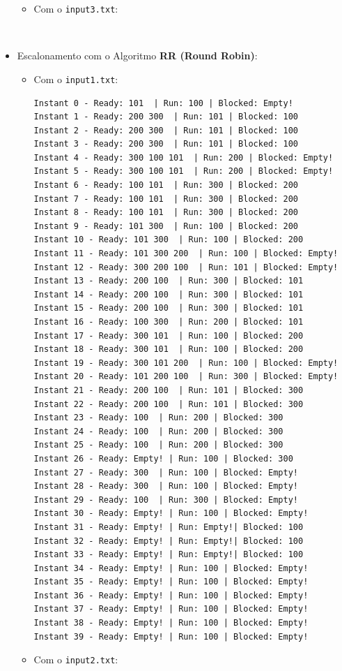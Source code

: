 \documentclass[11pt]{article}   %
\begin{document}
\begin{itemize}
\begin{itemize}
\begin{verbatim}
        \end{verbatim}
        \item Com o \verb|input3.txt|:
        \begin{verbatim}
            
        \end{verbatim}
    \end{itemize}
    \item Escalonamento com o Algoritmo \textbf{RR (Round Robin)}:
    \begin{itemize}
        \item Com o \verb|input1.txt|:
        \begin{verbatim}
Instant 0 - Ready: 101  | Run: 100 | Blocked: Empty!
Instant 1 - Ready: 200 300  | Run: 101 | Blocked: 100 
Instant 2 - Ready: 200 300  | Run: 101 | Blocked: 100 
Instant 3 - Ready: 200 300  | Run: 101 | Blocked: 100 
Instant 4 - Ready: 300 100 101  | Run: 200 | Blocked: Empty!
Instant 5 - Ready: 300 100 101  | Run: 200 | Blocked: Empty!
Instant 6 - Ready: 100 101  | Run: 300 | Blocked: 200 
Instant 7 - Ready: 100 101  | Run: 300 | Blocked: 200 
Instant 8 - Ready: 100 101  | Run: 300 | Blocked: 200 
Instant 9 - Ready: 101 300  | Run: 100 | Blocked: 200 
Instant 10 - Ready: 101 300  | Run: 100 | Blocked: 200 
Instant 11 - Ready: 101 300 200  | Run: 100 | Blocked: Empty!
Instant 12 - Ready: 300 200 100  | Run: 101 | Blocked: Empty!
Instant 13 - Ready: 200 100  | Run: 300 | Blocked: 101 
Instant 14 - Ready: 200 100  | Run: 300 | Blocked: 101 
Instant 15 - Ready: 200 100  | Run: 300 | Blocked: 101 
Instant 16 - Ready: 100 300  | Run: 200 | Blocked: 101 
Instant 17 - Ready: 300 101  | Run: 100 | Blocked: 200 
Instant 18 - Ready: 300 101  | Run: 100 | Blocked: 200 
Instant 19 - Ready: 300 101 200  | Run: 100 | Blocked: Empty!
Instant 20 - Ready: 101 200 100  | Run: 300 | Blocked: Empty!
Instant 21 - Ready: 200 100  | Run: 101 | Blocked: 300 
Instant 22 - Ready: 200 100  | Run: 101 | Blocked: 300 
Instant 23 - Ready: 100  | Run: 200 | Blocked: 300 
Instant 24 - Ready: 100  | Run: 200 | Blocked: 300 
Instant 25 - Ready: 100  | Run: 200 | Blocked: 300 
Instant 26 - Ready: Empty! | Run: 100 | Blocked: 300 
Instant 27 - Ready: 300  | Run: 100 | Blocked: Empty!
Instant 28 - Ready: 300  | Run: 100 | Blocked: Empty!
Instant 29 - Ready: 100  | Run: 300 | Blocked: Empty!
Instant 30 - Ready: Empty! | Run: 100 | Blocked: Empty!
Instant 31 - Ready: Empty! | Run: Empty!| Blocked: 100 
Instant 32 - Ready: Empty! | Run: Empty!| Blocked: 100 
Instant 33 - Ready: Empty! | Run: Empty!| Blocked: 100 
Instant 34 - Ready: Empty! | Run: 100 | Blocked: Empty!
Instant 35 - Ready: Empty! | Run: 100 | Blocked: Empty!
Instant 36 - Ready: Empty! | Run: 100 | Blocked: Empty!
Instant 37 - Ready: Empty! | Run: 100 | Blocked: Empty!
Instant 38 - Ready: Empty! | Run: 100 | Blocked: Empty!
Instant 39 - Ready: Empty! | Run: 100 | Blocked: Empty!            
        \end{verbatim}
        \item Com o \verb|input2.txt|:
        \begin{verbatim}
            

\end{verbatim}
\end{itemize}
\end{itemize}
\end{document}
